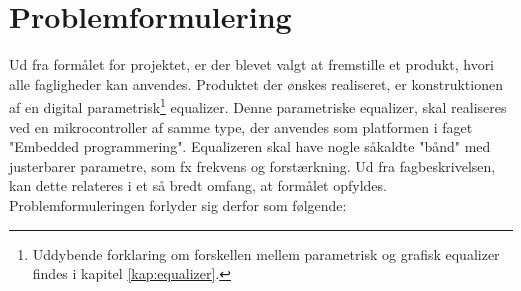 \section{Problemformulering}
%
%


%
Ud fra formålet for projektet, er der blevet valgt at fremstille et produkt, hvori alle fagligheder kan anvendes. 
Produktet der ønskes realiseret, er konstruktionen af en digital parametrisk\footnote{Uddybende forklaring om forskellen mellem parametrisk og grafisk equalizer findes i kapitel \ref{kap:equalizer}.} equalizer. 
Denne parametriske equalizer, skal realiseres ved en mikrocontroller af samme type, der anvendes som platformen i faget "Embedded programmering".
Equalizeren skal have nogle såkaldte "bånd" med justerbarer parametre, som fx frekvens og forstærkning. 
Ud fra fagbeskrivelsen, kan dette relateres i et så bredt omfang, at formålet opfyldes. 
Problemformuleringen forlyder sig derfor som følgende: \\

